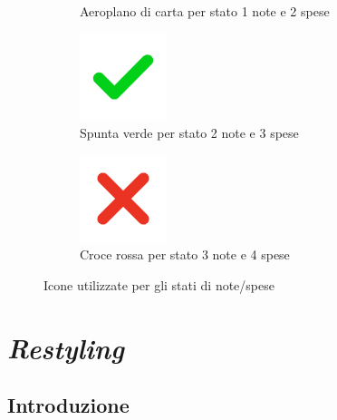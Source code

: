 \begin{figure}[H]
\begin{subfigure}[t]{.18\textwidth}
        \caption{Aeroplano di carta per stato 1 note e 2 spese}
    \end{subfigure} \hspace{1.2mm}
    \begin{subfigure}[t]{.18\textwidth}
        \centering
        \includegraphics[width=.5\columnwidth]{images/icons/icon_green_check.png}
        \caption{Spunta verde per stato 2 note e 3 spese}
    \end{subfigure} \hspace{1.2mm}
    \begin{subfigure}[t]{.18\textwidth}
        \centering
        \includegraphics[width=.5\columnwidth]{images/icons/icon_red_cross.png}
        \caption{Croce rossa per stato 3 note e 4 spese}
    \end{subfigure} \hspace{1.2mm}
    \caption{Icone utilizzate per gli stati di note/spese}
\end{figure}

\section{\emph{Restyling}}

\subsection{Introduzione}

